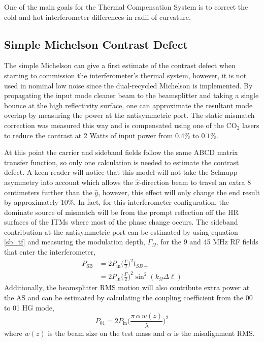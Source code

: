 	One of the main goals for the Thermal Compensation System is to correct the cold and hot interferometer differences in radii of curvature.
	
	\subsection{Simple Michelson Contrast Defect}
	The simple Michelson can give a first estimate of the contrast defect when starting to commission the interferometer's thermal system, however, it is not used in nominal low noise since the dual-recycled Michelson is implemented.  By propagating the input mode cleaner beam to the beamsplitter and taking a single bounce at the high reflectivity surface, one can approximate the resultant mode overlap by measuring the power at the antisymmetric port.  The static mismatch correction was measured this way and is compensated using one of the CO$_2$ lasers to reduce the contrast at 2 Watts of input power from $0.4\%$ to $0.1\%$.
	
	At this point the carrier and sideband fields follow the same ABCD matrix transfer function, so only one calculation is needed to estimate the contrast defect.  A keen reader will notice that this model will not take the Schnupp asymmetry into account which allows the $\hat{x}$-direction beam to travel an extra 8 centimeters further than the $\hat{y}$, however, this effect will only change the end result by approximately 10$\%$.  In fact, for this interferometer configuration, the dominate source of mismatch will be from the prompt reflection off the HR surfaces of the ITMs where most of the phase change occurs.  The sideband contribution at the antisymmetric port can be estimated by using equation \ref{sb_tf} and measuring the modulation depth, $\Gamma_{\Omega}$, for the 9 and 45 MHz RF fields that enter the interferometer,
	\begin{equation}
	\begin{aligned}
	P_{\text{SB}}	&= 2 P_{\text{in}} \bigg( \frac{\Gamma}{2} \bigg)^2 t_{SB\pm} \\
	&= 2 P_{\text{in}} \bigg( \frac{\Gamma}{2} \bigg)^2 \sin^2(k_{\Omega} \Delta \ell)
	\end{aligned}
	\end{equation}
	Additionally, the beamsplitter RMS motion will also contribute extra power at the AS and can be estimated by calculating the coupling coefficient from the 00 to 01 HG mode,
	\begin{equation}
	P_{01} = 2 P_{\text{in}} \bigg( \frac{\pi \, \alpha \, w(z)}{\lambda}\bigg)^2
	\end{equation}
	where $w(z)$ is the beam size on the test mass and $\alpha$ is the misalignment RMS.
	
